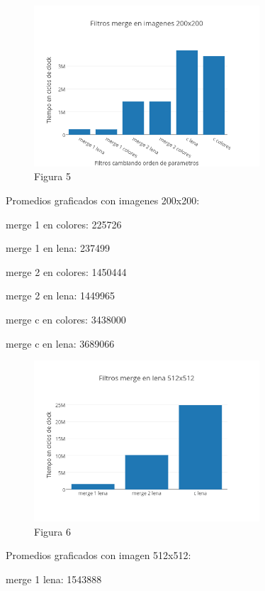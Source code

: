 \documentclass[a4paper]{article}
\begin{document}
\begin{figure}[h]
  \centering
    \includegraphics[width=0.75\textwidth]{imagenes/FiltrosMergeEnImagenes200x200.png}
  \caption{Figura 5}
  \label{fig:graficomerge1}
\end{figure}
 \FloatBarrier

Promedios graficados con imagenes 200x200:

merge 1 en colores: 225726

merge 1 en lena: 237499

merge 2 en colores: 1450444

merge 2 en lena: 1449965

merge c en colores: 3438000
 
merge c en lena: 3689066

\begin{figure}[h]
  \centering
    \includegraphics[width=0.75\textwidth]{imagenes/FiltrosMergeEnLena512x512.png}
  \caption{Figura 6}
  \label{fig:graficomerge2}
\end{figure}
 \FloatBarrier

Promedios graficados con imagen 512x512:

merge 1 lena: 1543888
\end{document}
